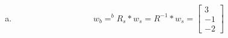 \begin{enumerate}[(a)]
    \item 
    \[w_b = ^bR_s * w_s = R^{-1} * w_s = \begin{bmatrix}3 \\ -1 \\-2 \end{bmatrix}\]
\end{enumerate}